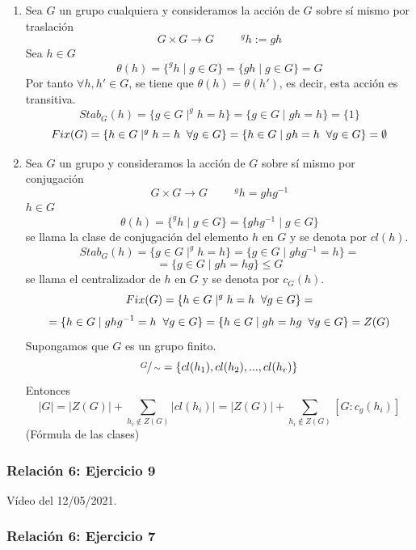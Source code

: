 \documentclass[11pt,a4paper]{article}
\begin{document}
\begin{enumerate}[label = \arabic*)]
\item Sea $G$ un grupo cualquiera y consideramos la acción de $G$ sobre sí mismo por traslación
$$G \times G \to G \hspace{1cm} ^{g}h := gh$$
Sea $h \in G$
$$\theta (h) = \{^{g}h \mid g \in G\} = \{gh \mid g \in G\} = G$$
Por tanto $\forall h, h' \in G$, se tiene que $\theta(h) = \theta(h')$, es decir, esta acción es transitiva.
$$Stab_{G}(h) = \{g \in G \mid ^{g}h = h\} = \{g \in G \mid gh = h\} = \{1\}$$
$$Fix(G) = \{h \in G \mid ^{g}h = h \hspace{0.2cm} \forall g \in G\} = \{h \in G \mid gh = h \hspace{0.2cm} \forall g \in G\} = \emptyset$$
\item Sea $G$ un grupo y consideramos la acción de $G$ sobre sí mismo por conjugación
$$G \times G \to G \hspace{1cm} ^{g}h = ghg^{-1}$$
$h \in G$
$$\theta(h) = \{^{g}h \mid g \in G\} = \{ghg^{-1} \mid g \in G\}$$
se llama la clase de conjugación del elemento $h$ en $G$ y se denota por $cl(h)$.
$$Stab_{G}(h) = \{g \in G \mid ^{g}h = h\} = \{g \in G \mid ghg^{-1} = h\} =$$ $$= \{g \in G \mid gh = hg\} \leqslant G$$
se llama el centralizador de $h$ en $G$ y se denota por $c_{G}(h)$.
$$Fix(G) = \{h \in G \mid ^{g}h = h \hspace{0.2cm} \forall g \in G\}  =$$ $$= \{h \in G \mid ghg^{-1} = h \hspace{0.2cm} \forall g \in G\} = \{h \in G \mid gh = hg \hspace{0.2cm} \forall g \in G\} = Z(G)$$
Supongamos que $G$ es un grupo finito.
$$\sfrac{G}{\sim} = \{cl(h_{1}), cl(h_{2}), ..., cl(h_{r})\}$$
Entonces
$$|G| = |Z(G)| + \sum_{h_{i} \notin Z(G)} |cl(h_{i})| = |Z(G)| + \sum_{h_{i} \notin Z(G)} [G:c_{g}(h_{i})]$$
(Fórmula de las clases)
\end{enumerate}

\subsubsection*{Relación 6: Ejercicio 9}

Vídeo del 12/05/2021.


\subsubsection*{Relación 6: Ejercicio 7}
\end{document}
